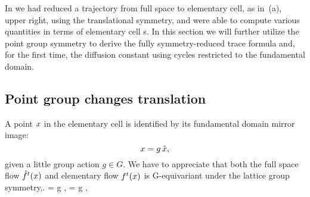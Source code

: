 




In  we had
reduced a trajectory from full space to elementary cell, as in
\,(a), upper right, using the translational
symmetry, and were able to compute various quantities in terms of
elementary cell \po s. In this section we will further utilize the
point group symmetry to derive the fully symmetry-reduced trace
formula and, for the first time, the diffusion constant using cycles
restricted to the fundamental domain.


\subsection{Point group changes translation \label{s-FundTranslation}}

A point $x$ in the elementary cell is identified by its
fundamental domain mirror image:
\[ %
\ssp=g\,\tx,
\] %
given a little group action $g\in G$. We have to appreciate that both
the full space flow ${\hat{f}^{t}(x)}$ and elementary flow
${f^{t}(x)} $ is G-equivariant under the lattice group symmetry,.
\beq
{} = g\,\,,
 = g\,\,,
\label{eq-equivariance-flow}
\eeq

